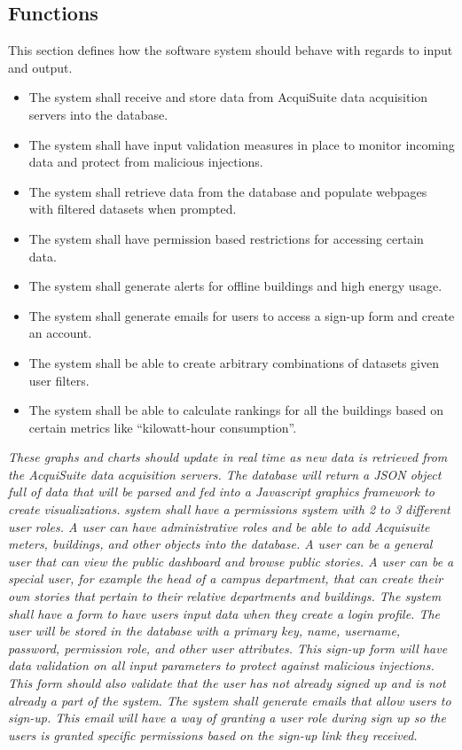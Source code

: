 \documentclass[onecolumn, draftclsnofoot,10pt, compsoc]{IEEEtran}
\begin{document}
    
    \subsection{Functions}
    This section defines how the software system should behave with regards to input and output.
    \begin{itemize}
    \item The system shall receive and store data from AcquiSuite data acquisition servers into the database. 
    \item The system shall have input validation measures in place to monitor incoming data and protect from malicious injections.
    \item The system shall retrieve data from the database and populate webpages with filtered datasets when prompted.
    \item The system shall have permission based restrictions for accessing certain data.
    \item The system shall generate alerts for offline buildings and high energy usage.
    \item The system shall generate emails for users to access a sign-up form and create an account.
    \item The system shall be able to create arbitrary combinations of datasets given user filters.
    \item The system shall be able to calculate rankings for all the buildings based on certain metrics like ``kilowatt-hour consumption''.
    \end{itemize}
    \textit{These graphs and charts should update in real time as new data is retrieved from the AcquiSuite data acquisition servers. The database will return a JSON object full of data that will be parsed and fed into a Javascript graphics framework to create visualizations.}
    \textit{system shall have a permissions system with 2 to 3 different user roles. A user can have administrative roles and be able to add Acquisuite meters, buildings, and other objects into the database. A user can be a general user that can view the public dashboard and browse public stories. A user can be a special user, for example the head of a campus department, that can create their own stories that pertain to their relative departments and buildings. 
    The system shall have a form to have users input data when they create a login profile. The user will be stored in the database with a primary key, name, username, password, permission role, and other user attributes. This sign-up form will have data validation on all input parameters to protect against malicious injections. This form should also validate that the user has not already signed up and is not already a part of the system.
    The system shall generate emails that allow users to sign-up. This email will have a way of granting a user role during sign up so the users is granted specific permissions based on the sign-up link they received. }
\end{document}
